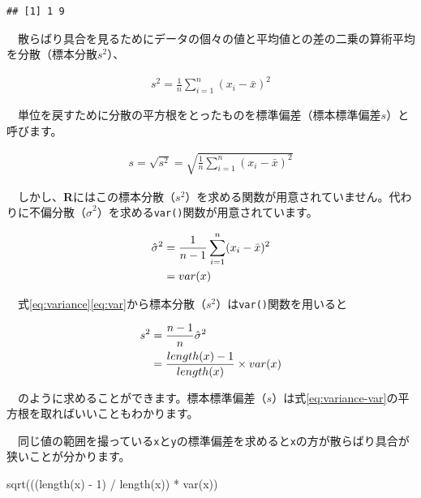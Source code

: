 \documentclass[
  12pt,
]{book}
\newenvironment{Shaded}{\begin{snugshade}}{\end{snugshade}}
\newcommand{\DecValTok}[1]{\textcolor[rgb]{0.00,0.00,0.81}{#1}}
\newcommand{\FunctionTok}[1]{\textcolor[rgb]{0.00,0.00,0.00}{#1}}
\newcommand{\NormalTok}[1]{#1}
\newcommand{\SpecialCharTok}[1]{\textcolor[rgb]{0.00,0.00,0.00}{#1}}
\begin{document}
\begin{verbatim}
## [1] 1 9
\end{verbatim}

　散らばり具合を見るためにデータの個々の値と平均値との差の二乗の算術平均を分散（標本分散\(s^2\)）、

\begin{align}
  s^2 = \frac{1}{n} \sum_{i = 1}^n (x_i - \bar{x})^2 \label{eq:variance}
\end{align}

　単位を戻すために分散の平方根をとったものを標準偏差（標本標準偏差\(s\)）と呼びます。

\begin{align}
  s = \sqrt{s^2} = \sqrt{\frac{1}{n} \sum_{i = 1}^n (x_i - \bar{x})^2} \label{eq:standatd-deviation}
\end{align}

　しかし、\textbf{R}にはこの標本分散（\(s^2\)）を求める関数が用意されていません。代わりに不偏分散（\(\hat{\sigma}^2\)）を求める\texttt{var()}関数が用意されています。

\begin{align}
  \hat{\sigma}^2 &= \frac{1}{n - 1} \sum_{i = 1}^n (x_i - \bar{x})^2 \label{eq:var} \\
  &= var(x) \notag
\end{align}

　式\eqref{eq:variance}\eqref{eq:var}から標本分散（\(s^2\)）は\texttt{var()}関数を用いると

\begin{align}
  s^2 &= \frac{n - 1}{n}\hat{\sigma}^2 \label{eq:variance-var} \\
  &= \frac{length(x) - 1}{length(x)} \times var(x) \notag
\end{align}

　のように求めることができます。標本標準偏差（\(s\)）は式\eqref{eq:variance-var}の平方根を取ればいいこともわかります。

　同じ値の範囲を撮っている\texttt{x}と\texttt{y}の標準偏差を求めると\texttt{x}の方が散らばり具合が狭いことが分かります。

\begin{Shaded}
\begin{Highlighting}[numbers=left,,]
\FunctionTok{sqrt}\NormalTok{(((}\FunctionTok{length}\NormalTok{(x) }\SpecialCharTok{{-}} \DecValTok{1}\NormalTok{) }\SpecialCharTok{/} \FunctionTok{length}\NormalTok{(x)) }\SpecialCharTok{*} \FunctionTok{var}\NormalTok{(x))}
\end{Highlighting}
\end{Shaded}
\end{document}
